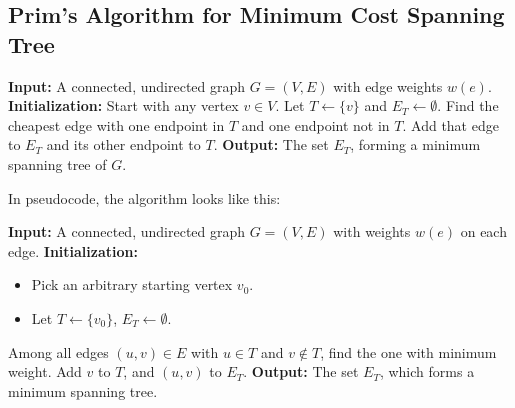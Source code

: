 \subsection{Prim's Algorithm for Minimum Cost Spanning Tree}

\begin{algorithm}[H]
\caption{Prim's Algorithm (Descriptive Version)}
\begin{algorithmic}[1]
\State \textbf{Input:} A connected, undirected graph \( G = (V, E) \) with edge weights \( w(e) \).
\State \textbf{Initialization:} Start with any vertex \( v \in V \). Let \( T \gets \{v\} \) and \( E_T \gets \emptyset \).
\Repeat
  \State Find the cheapest edge with one endpoint in \( T \) and one endpoint not in \( T \).
  \State Add that edge to \( E_T \) and its other endpoint to \( T \).
\State \textbf{Output:} The set \( E_T \), forming a minimum spanning tree of \( G \).
\end{algorithmic}
\end{algorithm}

In pseudocode, the algorithm looks like this:

\begin{algorithm}[H]
\caption{Prim's Algorithm}
\begin{algorithmic}[1]
\State \textbf{Input:} A connected, undirected graph \( G = (V, E) \) with weights \( w(e) \) on each edge.
\State \textbf{Initialization:}
  \begin{itemize}
    \item Pick an arbitrary starting vertex \( v_0 \).
    \item Let \( T \gets \{v_0\} \), \( E_T \gets \emptyset \).
  \end{itemize}
  \State Among all edges \( (u, v) \in E \) with \( u \in T \) and \( v \notin T \), find the one with minimum weight.
  \State Add \( v \) to \( T \), and \( (u,v) \) to \( E_T \).
\EndWhile
\State \textbf{Output:} The set \( E_T \), which forms a minimum spanning tree.
\end{algorithmic}
\end{algorithm}


